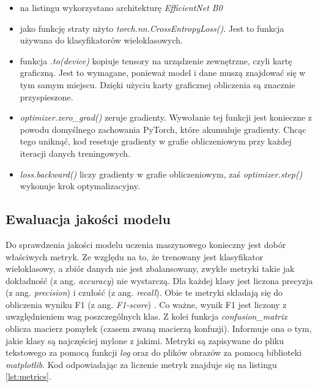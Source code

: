 \begin{itemize}
    \item na listingu wykorzystano architekturę \textit{EfficientNet B0}
    \item jako funkcję straty użyto \textit{torch.nn.CrossEntropyLoss()}.
    Jest to funkcja używana do klasyfikatorów wieloklasowych.
    \item funkcja \textit{.to(device)} kopiuje tensory na urządzenie zewnętrzne, czyli kartę graficzną.
    Jest to wymagane, ponieważ model i dane muszą znajdować się w tym samym miejscu.
    Dzięki użyciu karty graficznej obliczenia są znacznie przyspieszone.
    \item \textit{optimizer.zero\_grad()} zeruje gradienty.
    Wywołanie tej funkcji jest konieczne z powodu domyślnego zachowania PyTorch, które akumuluje gradienty.
    Chcąc tego uniknąć, kod resetuje gradienty w grafie obliczeniowym przy każdej iteracji danych treningowych.
    \item \textit{loss.backward()} liczy gradienty w grafie obliczeniowym, zaś \textit{optimizer.step()} wykonuje krok optymalizacyjny.
\end{itemize}



\subsection{Ewaluacja jakości modelu}

Do sprawdzenia jakości modelu uczenia maszynowego konieczny jest dobór właściwych metryk.
Ze względu na to, że trenowany jest klasyfikator wieloklasowy, a zbiór danych nie jest zbalansowany, zwykłe metryki takie jak dokładność (z ang. \textit{accuracy}) nie wystarczą.
Dla każdej klasy jest liczona precyzja (z ang. \textit{precision}) i czułość (z ang. \textit{recall}).
Obie te metryki składają się do obliczenia wyniku F1 (z ang. \textit{F1-score}) \cite{geron}.
Co ważne, wynik F1 jest liczony z uwzględnieniem wag poszczególnych klas.
Z kolei funkcja \textit{confusion\_matrix} oblicza macierz pomyłek (czasem zwaną macierzą konfuzji).
Informuje ona o tym, jakie klasy są najczęściej mylone z jakimi.
Metryki są zapisywane do pliku tekstowego za pomocą funkcji \textit{log} oraz do plików obrazów za pomocą biblioteki \textit{matplotlib}.
Kod odpowiadając za liczenie metryk znajduje się na listingu \ref{lst:metrics}.


